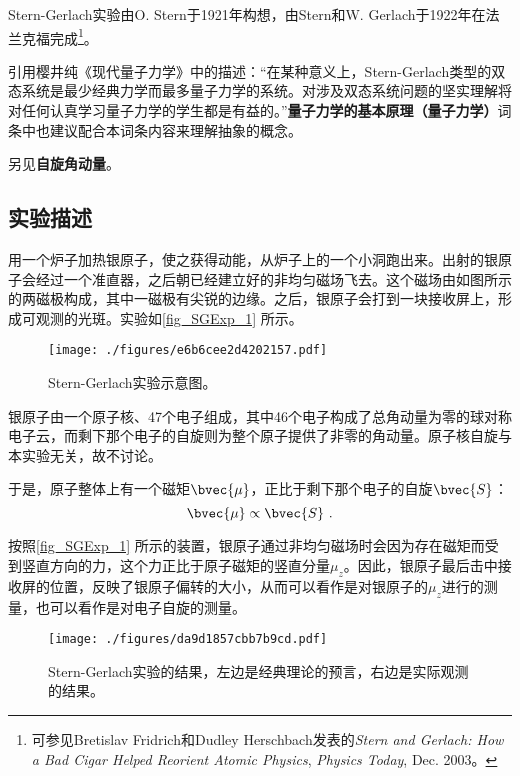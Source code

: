 


Stern-Gerlach实验由O. Stern于1921年构想，由Stern和W. Gerlach于1922年在法兰克福完成\footnote{可参见Bretislav Fridrich和Dudley Herschbach发表的\textsl{Stern and Gerlach: How a Bad Cigar Helped Reorient Atomic Physics}, \textsl{Physics Today}, Dec. 2003。}。

引用樱井纯《现代量子力学》中的描述：“在某种意义上，Stern-Gerlach类型的双态系统是最少经典力学而最多量子力学的系统。对涉及双态系统问题的坚实理解将对任何认真学习量子力学的学生都是有益的。”\textbf{量子力学的基本原理（量子力学）}词条中也建议配合本词条内容来理解抽象的概念。

另见\textbf{自旋角动量}。


\subsection{实验描述}

用一个炉子加热银原子，使之获得动能，从炉子上的一个小洞跑出来。出射的银原子会经过一个准直器，之后朝已经建立好的非均匀磁场飞去。这个磁场由如图所示的两磁极构成，其中一磁极有尖锐的边缘。之后，银原子会打到一块接收屏上，形成可观测的光斑。实验如\autoref{fig_SGExp_1} 所示。


\begin{figure}[ht]
\centering
\texttt{[image: ./figures/e6b6cee2d4202157.pdf]}
\caption{Stern-Gerlach实验示意图。} \label{fig_SGExp_1}
\end{figure}

银原子由一个原子核、47个电子组成，其中46个电子构成了总角动量为零的球对称电子云，而剩下那个电子的自旋则为整个原子提供了非零的角动量。原子核自旋与本实验无关，故不讨论。

于是，原子整体上有一个磁矩$\bvec{\mu}$，正比于剩下那个电子的自旋$\bvec{S}$：
\begin{equation}
\bvec{\mu}\propto\bvec{S}~.
\end{equation}

按照\autoref{fig_SGExp_1} 所示的装置，银原子通过非均匀磁场时会因为存在磁矩而受到竖直方向的力，这个力正比于原子磁矩的竖直分量$\mu_z$。因此，银原子最后击中接收屏的位置，反映了银原子偏转的大小，从而可以看作是对银原子的$\mu_z$进行的测量，也可以看作是对电子自旋的测量。




\begin{figure}[ht]
\centering
\texttt{[image: ./figures/da9d1857cbb7b9cd.pdf]}
\caption{Stern-Gerlach实验的结果，左边是经典理论的预言，右边是实际观测的结果。} \label{fig_SGExp_2}
\end{figure}


